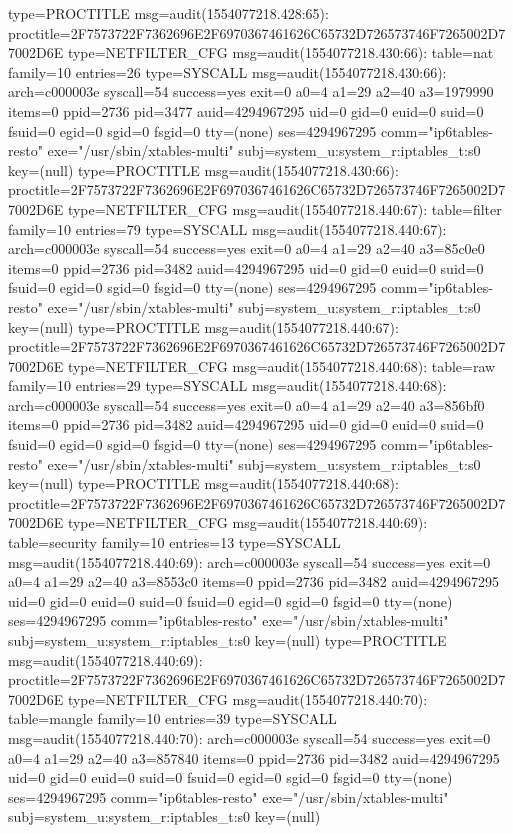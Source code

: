 \documentclass[]{report}
\newenvironment{Shaded}{}{}
\newcommand{\NormalTok}[1]{#1}
\begin{document}
\begin{Shaded}
\begin{Highlighting}[]
\NormalTok{type=PROCTITLE msg=audit(1554077218.428:65): proctitle=2F7573722F7362696E2F6970367461626C65732D726573746F7265002D77002D6E}
\NormalTok{type=NETFILTER_CFG msg=audit(1554077218.430:66): table=nat family=10 entries=26}
\NormalTok{type=SYSCALL msg=audit(1554077218.430:66): arch=c000003e syscall=54 success=yes exit=0 a0=4 a1=29 a2=40 a3=1979990 items=0 ppid=2736 pid=3477 auid=4294967295 uid=0 gid=0 euid=0 suid=0 fsuid=0 egid=0 sgid=0 fsgid=0 tty=(none) ses=4294967295 comm="ip6tables-resto" exe="/usr/sbin/xtables-multi" subj=system_u:system_r:iptables_t:s0 key=(null)}
\NormalTok{type=PROCTITLE msg=audit(1554077218.430:66): proctitle=2F7573722F7362696E2F6970367461626C65732D726573746F7265002D77002D6E}
\NormalTok{type=NETFILTER_CFG msg=audit(1554077218.440:67): table=filter family=10 entries=79}
\NormalTok{type=SYSCALL msg=audit(1554077218.440:67): arch=c000003e syscall=54 success=yes exit=0 a0=4 a1=29 a2=40 a3=85c0e0 items=0 ppid=2736 pid=3482 auid=4294967295 uid=0 gid=0 euid=0 suid=0 fsuid=0 egid=0 sgid=0 fsgid=0 tty=(none) ses=4294967295 comm="ip6tables-resto" exe="/usr/sbin/xtables-multi" subj=system_u:system_r:iptables_t:s0 key=(null)}
\NormalTok{type=PROCTITLE msg=audit(1554077218.440:67): proctitle=2F7573722F7362696E2F6970367461626C65732D726573746F7265002D77002D6E}
\NormalTok{type=NETFILTER_CFG msg=audit(1554077218.440:68): table=raw family=10 entries=29}
\NormalTok{type=SYSCALL msg=audit(1554077218.440:68): arch=c000003e syscall=54 success=yes exit=0 a0=4 a1=29 a2=40 a3=856bf0 items=0 ppid=2736 pid=3482 auid=4294967295 uid=0 gid=0 euid=0 suid=0 fsuid=0 egid=0 sgid=0 fsgid=0 tty=(none) ses=4294967295 comm="ip6tables-resto" exe="/usr/sbin/xtables-multi" subj=system_u:system_r:iptables_t:s0 key=(null)}
\NormalTok{type=PROCTITLE msg=audit(1554077218.440:68): proctitle=2F7573722F7362696E2F6970367461626C65732D726573746F7265002D77002D6E}
\NormalTok{type=NETFILTER_CFG msg=audit(1554077218.440:69): table=security family=10 entries=13}
\NormalTok{type=SYSCALL msg=audit(1554077218.440:69): arch=c000003e syscall=54 success=yes exit=0 a0=4 a1=29 a2=40 a3=8553c0 items=0 ppid=2736 pid=3482 auid=4294967295 uid=0 gid=0 euid=0 suid=0 fsuid=0 egid=0 sgid=0 fsgid=0 tty=(none) ses=4294967295 comm="ip6tables-resto" exe="/usr/sbin/xtables-multi" subj=system_u:system_r:iptables_t:s0 key=(null)}
\NormalTok{type=PROCTITLE msg=audit(1554077218.440:69): proctitle=2F7573722F7362696E2F6970367461626C65732D726573746F7265002D77002D6E}
\NormalTok{type=NETFILTER_CFG msg=audit(1554077218.440:70): table=mangle family=10 entries=39}
\NormalTok{type=SYSCALL msg=audit(1554077218.440:70): arch=c000003e syscall=54 success=yes exit=0 a0=4 a1=29 a2=40 a3=857840 items=0 ppid=2736 pid=3482 auid=4294967295 uid=0 gid=0 euid=0 suid=0 fsuid=0 egid=0 sgid=0 fsgid=0 tty=(none) ses=4294967295 comm="ip6tables-resto" exe="/usr/sbin/xtables-multi" subj=system_u:system_r:iptables_t:s0 key=(null)}

\end{Highlighting}
\end{Shaded}
\end{document}
